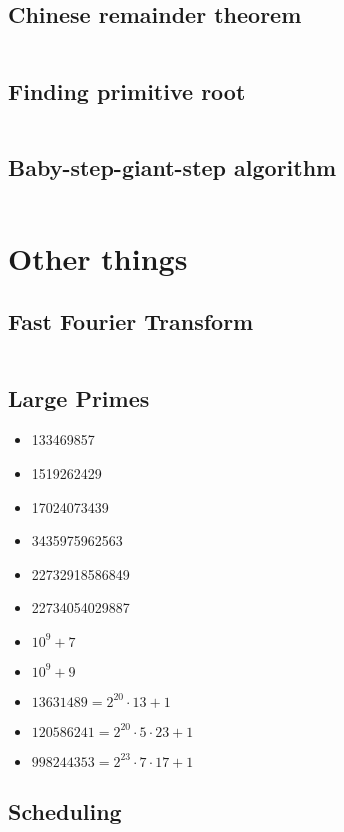 \documentclass[8pt,a4paper,landscape,oneside]{amsart}
\newcommand{\codec}[1]{\inputminted[fontsize=\large,tabsize=2,baselinestretch=1]{cpp}{code/#1}}
\newcommand{\codep}[1]{\inputminted[fontsize=\large,tabsize=2,baselinestretch=1]{py}{code/#1}}
\begin{document}
\begin{multicols*}{2}
\begin{large}
\subsection{Chinese remainder theorem}
\codep{crt.py}
\subsection{Finding primitive root}
\codep{primitiveroot.py}
\subsection{Baby-step-giant-step algorithm}
\codep{babystepgiantstep.py}
\section{Other things}
\subsection{Fast Fourier Transform}
\codec{fft.cpp}
\subsection{Large Primes}
\begin{itemize}
    \item 133469857
    \item 1519262429
    \item 17024073439
    \item 3435975962563
    \item 22732918586849
    \item 22734054029887
    \item $10^9+7$
    \item $10^9+9$
    \item $13631489 = 2^{20}\cdot 13 + 1$
    \item $120586241 = 2^{20}\cdot 5\cdot 23 + 1$
    \item $998244353 = 2^{23}\cdot 7\cdot 17 + 1$
\end{itemize}
\subsection{Scheduling}
\codec{scheduling.cpp}

\end{large}
\end{multicols*}
\end{document}

